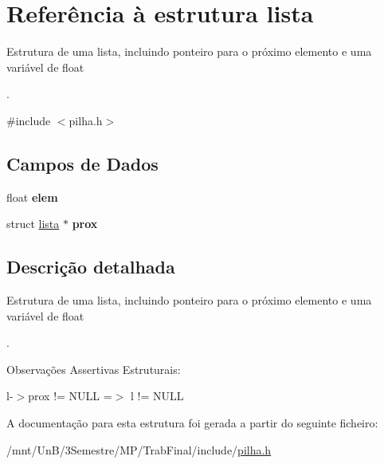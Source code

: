 \hypertarget{structlista}{\section{Referência à estrutura lista}
\label{structlista}
}


Estrutura de uma lista, incluindo ponteiro para o próximo elemento e uma variável de float \par
.  




{\ttfamily \#include $<$pilha.\-h$>$}

\subsection*{Campos de Dados}
\begin{DoxyCompactItemize}
\item 
\hypertarget{structlista_a1a929073226b819a7d681e2792fafda2_a1a929073226b819a7d681e2792fafda2}{float {\bfseries elem}}\label{structlista_a1a929073226b819a7d681e2792fafda2_a1a929073226b819a7d681e2792fafda2}

\item 
\hypertarget{structlista_a3b0e375147c1163d74544fd206a1f1de_a3b0e375147c1163d74544fd206a1f1de}{struct \hyperlink{structlista}{lista} $\ast$ {\bfseries prox}}\label{structlista_a3b0e375147c1163d74544fd206a1f1de_a3b0e375147c1163d74544fd206a1f1de}

\end{DoxyCompactItemize}


\subsection{Descrição detalhada}
Estrutura de uma lista, incluindo ponteiro para o próximo elemento e uma variável de float \par
. 

\begin{DoxyRemark}{Observações}
Assertivas Estruturais\-:
\begin{DoxyItemize}
\item l-\/$>$prox != N\-U\-L\-L =$>$ l != N\-U\-L\-L 
\end{DoxyItemize}
\end{DoxyRemark}


A documentação para esta estrutura foi gerada a partir do seguinte ficheiro\-:\begin{DoxyCompactItemize}
\item 
/mnt/\-Un\-B/3\-Semestre/\-M\-P/\-Trab\-Final/include/\hyperlink{pilha_8h}{pilha.\-h}\end{DoxyCompactItemize}
